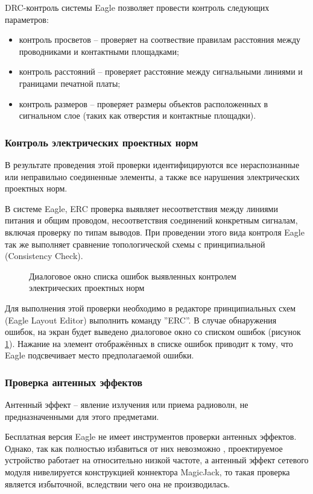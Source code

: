 DRC-контроль системы Eagle позволяет провести контроль следующих параметров:
\begin{itemize}
	\item{} контроль просветов -- проверяет на соотвествие правилам расстояния между
		проводниками и контактными площадками;
	\item{} контроль расстояний -- проверяет расстояние между сигнальными
		линиями и границами печатной платы;
	\item{} контроль размеров -- проверяет размеры объектов расположенных в сигнальном
		слое (таких как отверстия и контактные площадки).
\end{itemize}

\subsubsection{Контроль электрических проектных норм}
В результате проведения этой проверки идентифицируются все нераспознанные или
неправильно соединенные элементы, а также все нарушения электрических проектных норм.

В системе Eagle, ERC проверка выявляет несоответствия между линиями питания и общим проводом,
несоответствия соединений конкретным сигналам, включая проверку по типам выводов.
При проведении этого вида контроля Eagle так же выполняет сравнение топологической схемы
с принципиальной (Consistency Check).

\begin{figure}[ht]
	\caption{Диалоговое окно списка ошибок выявленных контролем электрических проектных норм}
	\label{img:erc}
\end{figure}

Для выполнения этой проверки необходимо в редакторе принципиальных схем (Eagle Layout Editor)
выполнить команду ''ERC''. В случае обнаружения ошибок, на экран будет выведено диалоговое окно
со списком ошибок (рисунок \ref{img:erc}). Нажание на элемент отображённых в списке ошибок приводит
к тому, что Eagle подсвечивает место предполагаемой ошибки.


\subsubsection{Проверка антенных эффектов}
Антенный эффект --  явление излучения или приема радиоволн, не предназначенными для этого
предметами.

Бесплатная версия Eagle не имеет инструментов проверки антенных эффектов. Однако, так как
полностью избавиться от них невозможно \cite{antennaeff}, проектируемое устройство работает
на относительно низкой частоте, а антенный эффект сетевого модуля нивелируется конструкцией
коннектора MagicJack, то такая проверка является избыточной, вследствии чего
она не производилась.
